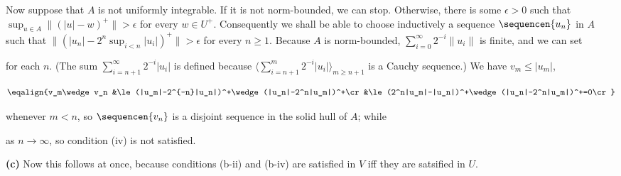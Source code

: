 {\medskip

 Now suppose that $A$
is not uniformly integrable.   If it is not norm-bounded, we can stop.
Otherwise, there is some $\epsilon>0$ such that
$\sup_{u\in A}\|(|u|-w)^+\|>\epsilon$ for every $w\in U^+$.
Consequently we shall be able to choose inductively a sequence
$\sequencen{u_n}$ in $A$ such that
$\|(|u_n|-2^n\sup_{i<n}|u_i|)^+\|>\epsilon$ for every $n\ge 1$.
Because $A$ is norm-bounded,
$\sum_{i=0}^{\infty}2^{-i}\|u_i\|$ is finite, and we can set


\noindent for each $n$.   (The sum $\sum_{i=n+1}^{\infty}2^{-i}|u_i|$ is
defined because $\langle\sum_{i=n+1}^m2^{-i}|u_i|\rangle_{m\ge n+1}$ is
a Cauchy sequence.)   We have $v_m\le|u_m|$,

$$\eqalign{v_m\wedge v_n
&\le(|u_m|-2^{-n}|u_n|)^+\wedge(|u_n|-2^n|u_m|)^+\cr
&\le(2^n|u_m|-|u_n|)^+\wedge(|u_n|-2^n|u_m|)^+=0\cr}$$

\noindent whenever $m<n$, so $\sequencen{v_n}$ is a disjoint sequence in
the solid hull of $A$;  while


\noindent as $n\to\infty$, so condition (iv) is not satisfied.

\medskip

{\bf (c)} Now this follows at once, because conditions (b-ii) and (b-iv)
are satisfied in $V$ iff they are satsified in $U$.
}%

